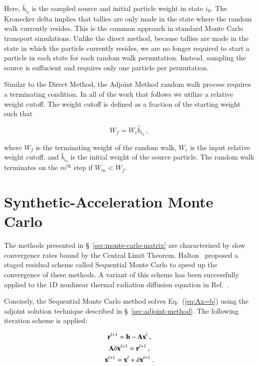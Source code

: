 \documentclass[preprint,12pt]{elsarticle}
\newcommand{\vA}{\ensuremath{\ve{A}}}
\newcommand{\vb}{\ensuremath{\ve{b}}}
\newcommand{\vx}{\ensuremath{\ve{x}}}
\newcommand{\vr}{\ensuremath{\ve{r}}}
\begin{document}
Here, $\hat{b}_{i_0}$ is the sampled source and initial particle
weight in state $i_0$.  The Kronecker delta implies that tallies are
only made in the state where the random walk currently resides.  This
is the common approach in standard Monte Carlo transport
simulations. Unlike the direct method, because tallies are made in the
state in which the particle currently resides, we are no longer
required to start a particle in each state for each random walk
permutation. Instead, sampling the source is suffucient and requires
only one particle per permutation.

Similar to the Direct Method, the Adjoint Method random walk process
requires a terminating condition.  In all of the work that follows we
utilize a relative weight cutoff.  The weight cutoff is defined as a
fraction of the starting weight such that

\begin{equation}
  W_f = W_c\hat{b}_{i_0}\:,
  \label{eq:weight_cutoff}
\end{equation}

where $W_f$ is the terminating weight of the random walk, $W_c$ is the
input relative weight cutoff, and $\hat{b}_{i_0}$ is the initial
weight of the source particle.  The random walk terminates on the
$m^\text{th}$ step if $W_m < W_f$.

\section{Synthetic-Acceleration Monte Carlo}
\label{sec:iter-refin-monte}

The methods presented in \S~\ref{sec:monte-carlo-matrix} are
characterized by slow convergence rates bound by the Central Limit
Theorem.  Halton~\cite{halton_1962,halton_1994} proposed a staged
residual scheme called Sequential Monte Carlo to speed up the
convergence of these methods.  A variant of this scheme has been
successfully applied to the 1D nonlinear thermal radiation diffusion
equation in Ref.~\cite{evans_2003}.

Concisely, the Sequential Monte Carlo method solves
Eq.~(\ref{eq:Ax=b}) using the adjoint solution technique described in
\S~\ref{sec:adjoint-method}.  The following iteration scheme is
applied:

\begin{subequations}
  \begin{gather}
    \vr^{l+1} = \vb - \vA\vx^{l}\:, \\
    \vA\delta\vx^{l+1} = \vr^{l+1}\:, \label{eq:residual_solve}\\
    \vx^{l+1} = \vx^{l} + \delta\vx^{l+1}\:.
  \end{gather}
\end{subequations}
\end{document}

